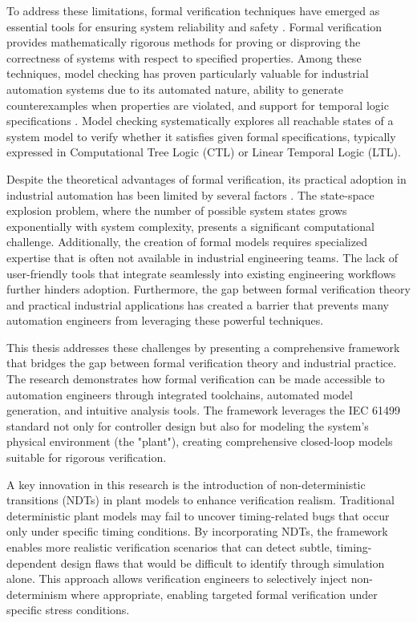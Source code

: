 To address these limitations, formal verification techniques have emerged as essential tools for ensuring system reliability and safety \cite{clarke1999}. Formal verification provides mathematically rigorous methods for proving or disproving the correctness of systems with respect to specified properties. Among these techniques, model checking has proven particularly valuable for industrial automation systems due to its automated nature, ability to generate counterexamples when properties are violated, and support for temporal logic specifications \cite{clarke1986automatic}. Model checking systematically explores all reachable states of a system model to verify whether it satisfies given formal specifications, typically expressed in Computational Tree Logic (CTL) \cite{emerson1985decision} or Linear Temporal Logic (LTL).

Despite the theoretical advantages of formal verification, its practical adoption in industrial automation has been limited by several factors \cite{vyatkin2008closed}. The state-space explosion problem, where the number of possible system states grows exponentially with system complexity, presents a significant computational challenge. Additionally, the creation of formal models requires specialized expertise that is often not available in industrial engineering teams. The lack of user-friendly tools that integrate seamlessly into existing engineering workflows further hinders adoption. Furthermore, the gap between formal verification theory and practical industrial applications has created a barrier that prevents many automation engineers from leveraging these powerful techniques.

This thesis addresses these challenges by presenting a comprehensive framework that bridges the gap between formal verification theory and industrial practice. The research demonstrates how formal verification can be made accessible to automation engineers through integrated toolchains, automated model generation, and intuitive analysis tools. The framework leverages the IEC 61499 standard not only for controller design but also for modeling the system's physical environment (the "plant"), creating comprehensive closed-loop models suitable for rigorous verification.

A key innovation in this research is the introduction of non-deterministic transitions (NDTs) in plant models to enhance verification realism. Traditional deterministic plant models may fail to uncover timing-related bugs that occur only under specific timing conditions. By incorporating NDTs, the framework enables more realistic verification scenarios that can detect subtle, timing-dependent design flaws that would be difficult to identify through simulation alone. This approach allows verification engineers to selectively inject non-determinism where appropriate, enabling targeted formal verification under specific stress conditions.

